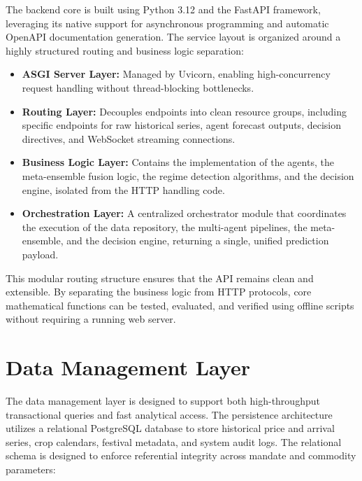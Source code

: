 \documentclass[12pt,a4paper]{report}
\theoremstyle{definition}
\theoremstyle{remark}
\begin{document}
The backend core is built using Python 3.12 and the FastAPI framework, leveraging its native support for asynchronous programming and automatic OpenAPI documentation generation. The service layout is organized around a highly structured routing and business logic separation:

\begin{itemize}
    \item \textbf{ASGI Server Layer:} Managed by Uvicorn, enabling high-concurrency request handling without thread-blocking bottlenecks.
    \item \textbf{Routing Layer:} Decouples endpoints into clean resource groups, including specific endpoints for raw historical series, agent forecast outputs, decision directives, and WebSocket streaming connections.
    \item \textbf{Business Logic Layer:} Contains the implementation of the agents, the meta-ensemble fusion logic, the regime detection algorithms, and the decision engine, isolated from the HTTP handling code.
    \item \textbf{Orchestration Layer:} A centralized orchestrator module that coordinates the execution of the data repository, the multi-agent pipelines, the meta-ensemble, and the decision engine, returning a single, unified prediction payload.
\end{itemize}

This modular routing structure ensures that the API remains clean and extensible. By separating the business logic from HTTP protocols, core mathematical functions can be tested, evaluated, and verified using offline scripts without requiring a running web server.

\section{Data Management Layer}

The data management layer is designed to support both high-throughput transactional queries and fast analytical access. The persistence architecture utilizes a relational PostgreSQL database to store historical price and arrival series, crop calendars, festival metadata, and system audit logs. The relational schema is designed to enforce referential integrity across mandate and commodity parameters:
\end{document}
